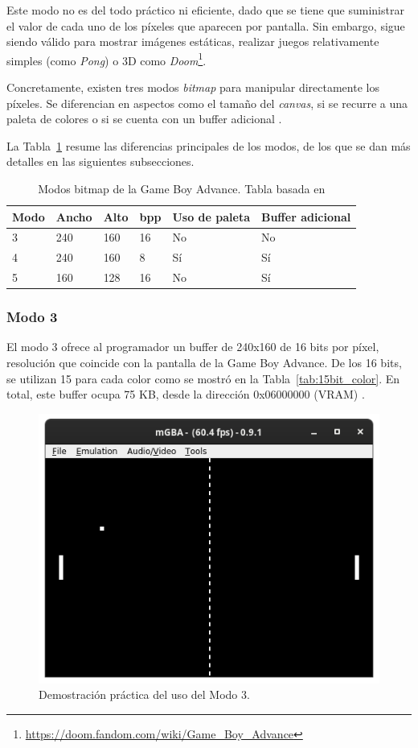 Este modo no es del todo práctico ni eficiente, dado que se tiene que suministrar el valor de cada uno de los píxeles que aparecen por pantalla. Sin embargo, sigue siendo válido para mostrar imágenes estáticas, realizar juegos relativamente simples (como \textit{Pong}) o 3D como \textit{Doom}\footnote{\url{https://doom.fandom.com/wiki/Game_Boy_Advance}}.

Concretamente, existen tres modos \textit{bitmap} para manipular directamente los píxeles. Se diferencian en aspectos como el tamaño del \textit{canvas}, si se recurre a una paleta de colores o si se cuenta con un buffer adicional  \cite{bib:gba_manual}.

La Tabla~\ref{tab:modos_bitmap} resume las diferencias principales de los modos, de los que se dan más detalles en las siguientes subsecciones.

\begin{table}[h]
	\centering
	\begin{tabular}{| l | l | l | l | l | l |}
		\hline
		\textbf{Modo} & \textbf{Ancho} & \textbf{Alto} & \textbf{bpp} & \textbf{Uso de paleta} & \textbf{Buffer adicional} \\ \hline
		3 & 240 & 160 & 16 & No & No \\ \hline
		4 & 240 & 160 & 8 & Sí & Sí \\ \hline
		5 & 160 & 128 & 16 & No & Sí \\ \hline
	\end{tabular}
	\caption{Modos bitmap de la Game Boy Advance. Tabla basada en \cite{bib:tonc}}
	\label{tab:modos_bitmap}
\end{table}
\FloatBarrier{}

\subsubsection{Modo 3}\label{sec:mode_3}
El modo 3 ofrece al programador un buffer de 240x160 de 16 bits por píxel, resolución que coincide con la pantalla de la Game Boy Advance. De los 16 bits, se utilizan 15 para cada color como se mostró en la Tabla~\ref{tab:15bit_color}. En total, este buffer ocupa 75 KB, desde la dirección 0x06000000 (VRAM) \cite{bib:gba_manual}.

\begin{figure}[h]
	\centering
	\includegraphics[width=.55\textwidth]{capitulos/capitulo3/bitmaps_3.png}
	\caption{Demostración práctica del uso del Modo 3.}
	\label{fig:modo_3}
\end{figure}
\FloatBarrier

